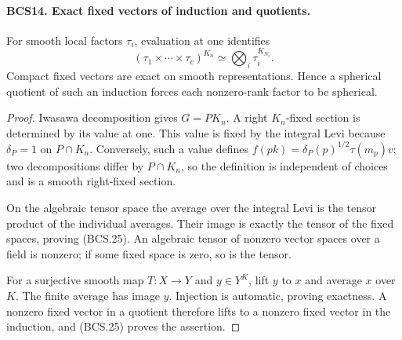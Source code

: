 \paragraph{BCS14. Exact fixed vectors of induction and quotients.}
\label{claim:BCS14}
For smooth local factors \(\tau_i\), evaluation at one identifies
\[
 (\tau_1\times\cdots\times\tau_c)^{K_n}
                  \simeq\bigotimes_i\tau_i^{K_{N_i}}.
 \tag{BCS.25}
\]
Compact fixed vectors are exact on smooth representations.  Hence a
spherical quotient of such an induction forces each nonzero-rank
factor to be spherical.
\begin{proof}
Iwasawa decomposition gives \(G=PK_n\).  A right \(K_n\)-fixed
section is determined by its value at one.  This value is fixed by
the integral Levi because \(\delta_P=1\) on \(P\cap K_n\).
Conversely, such a value defines
\(f(pk)=\delta_P(p)^{1/2}\tau(m_p)v\); two decompositions
differ by \(P\cap K_n\), so the definition is independent of
choices and is a smooth right-fixed section.

On the algebraic tensor space the average over the integral Levi is
the tensor product of the individual averages.  Their image is
exactly the tensor of the fixed spaces, proving (BCS.25).  An
algebraic tensor of nonzero vector spaces over a field is nonzero;
if some fixed space is zero, so is the tensor.

For a surjective smooth map \(T:X\to Y\) and \(y\in Y^K\),
lift \(y\) to \(x\) and average \(x\) over \(K\).  The finite
average has image \(y\).  Injection is automatic, proving exactness.
A nonzero fixed vector in a quotient therefore lifts to a nonzero
fixed vector in the induction, and (BCS.25) proves the assertion.
\end{proof}

